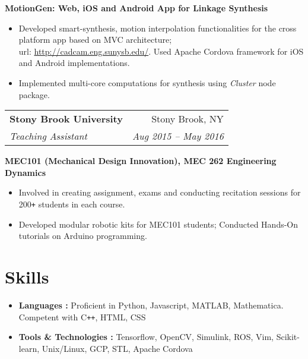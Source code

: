 \documentclass[letterpaper,10pt]{article}
\makeatletter
\newcommand{\resumeHeading}[4]{
  \vspace{-1pt}
    \begin{tabular*}{0.97\textwidth}{l@{\extracolsep{\fill}}r}
      \textbf{#1} & #2 \vspace{-2pt}\\ \vspace{1pt}
      \textit{\small#3} & \textit{\small #4} \\
    \end{tabular*}
}
\newcommand{\resumeSubheading}[1]{
      {\small\textbf{#1}} \\
}
\newcommand{\resumeSection}[1]{
\vspace{-12pt}
\section{\textbf{#1}}
}
\newcommand{\resumeItemListStart}{
\vspace{-7pt}
\begin{itemize}[leftmargin=14pt]
}
\newcommand{\resumeItemListEnd}{
\vspace{+7pt}
\end{itemize}
}
\newcommand{\resumeItem}[1]{
  \item\small{
      {#1 \vspace{-7pt}
      }
  }
}
\makeatother
\begin{document}
      \vspace{-5pt}
      \resumeSubheading{MotionGen: Web, iOS and Android App for Linkage Synthesis}
      \resumeItemListStart
        \resumeItem{Developed smart-synthesis, motion interpolation functionalities for the cross platform app based on MVC architecture; \\ url: \href{http://cadcam.eng.sunysb.edu/}{http://cadcam.eng.sunysb.edu/}. Used Apache Cordova framework for iOS and Android implementations.}
        \resumeItem{Implemented multi-core computations for synthesis using \emph{Cluster} node package.}
      \resumeItemListEnd

    \resumeHeading
      {Stony Brook University}{Stony Brook, NY}
      {Teaching Assistant}{Aug 2015 -- May 2016}
      \resumeSubheading{MEC101 (Mechanical Design Innovation), MEC 262 Engineering Dynamics}
      \resumeItemListStart
        \resumeItem{Involved in creating assignment, exams and conducting recitation sessions for 200\texttt{+} students in each course.}
        \resumeItem{Developed modular robotic kits for MEC101 students; Conducted Hands-On tutorials on Arduino programming.}
      \resumeItemListEnd

\resumeSection{Skills}
\vspace{+7pt}
    \resumeItemListStart
      \resumeItem{\textbf{Languages :} Proficient in Python, Javascript, MATLAB, Mathematica. Competent with C\texttt{++}, HTML, CSS}
      \resumeItem{\textbf{Tools \& Technologies :} Tensorflow, OpenCV, Simulink, ROS, Vim, Scikit-learn, Unix/Linux, GCP, STL, Apache Cordova}
    \resumeItemListEnd
\end{document}
